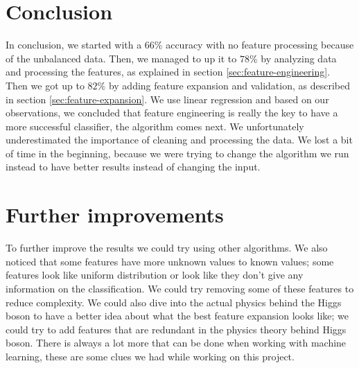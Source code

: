 \documentclass[10pt,conference,compsocconf]{IEEEtran}
\begin{document}
\section{Conclusion}
In conclusion, we started with a $66\%$ accuracy with no feature processing because of the unbalanced data. Then, we managed to up it to $78\%$ by analyzing data and processing the features, as explained in section \ref{sec:feature-engineering}. Then we got up to $82\%$ by adding feature expansion and validation, as described in section \ref{sec:feature-expansion}. We use linear regression and based on our observations, we concluded that feature engineering is really the key to have a more successful classifier, the algorithm comes next. We unfortunately underestimated the importance of cleaning and processing the data. We lost a bit of time in the beginning, because we were trying to change the algorithm we run instead to have better results instead of changing the input.

\section{Further improvements}
To further improve the results we could try using other algorithms. We also noticed that some features have more unknown values to known values; some features look like uniform distribution or look like they don't give any information on the classification. We could try removing some of these features to reduce complexity. We could also dive into the actual physics behind the Higgs boson to have a better idea about what the best feature expansion looks like; we could try to add features that are redundant in the physics theory behind Higgs boson. There is always a lot more that can be done when working with machine learning, these are some clues we had while working on this project.
\end{document}
